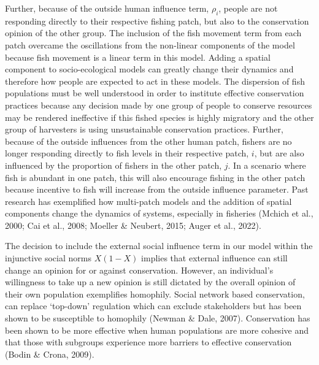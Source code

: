 \documentclass[
  12pt,
]{article}
\begin{document}
Further, because of the outside human influence term, \(\rho_i\), people are not responding directly to their respective fishing patch, but also to the conservation opinion of the other group. The inclusion of the fish movement term from each patch overcame the oscillations from the non-linear components of the model because fish movement is a linear term in this model. Adding a spatial component to socio-ecological models can greatly change their dynamics and therefore how people are expected to act in these models. The dispersion of fish populations must be well understood in order to institute effective conservation practices because any decision made by one group of people to conserve resources may be rendered ineffective if this fished species is highly migratory and the other group of harvesters is using unsustainable conservation practices. Further, because of the outside influences from the other human patch, fishers are no longer responding directly to fish levels in their respective patch, \(i\), but are also influenced by the proportion of fishers in the other patch, \(j\). In a scenario where fish is abundant in one patch, this will also encourage fishing in the other patch because incentive to fish will increase from the outside influence parameter. Past research has exemplified how multi-patch models and the addition of spatial components change the dynamics of systems, especially in fisheries (Mchich et al., 2000; Cai et al., 2008; Moeller \& Neubert, 2015; Auger et al., 2022).

The decision to include the external social influence term in our model within the injunctive social norms \(X(1-X)\) implies that external influence can still change an opinion for or against conservation. However, an individual's willingness to take up a new opinion is still dictated by the overall opinion of their own population exemplifies homophily. Social network based conservation, can replace `top-down' regulation which can exclude stakeholders but has been shown to be susceptible to homophily (Newman \& Dale, 2007). Conservation has been shown to be more effective when human populations are more cohesive and that those with subgroups experience more barriers to effective conservation (Bodin \& Crona, 2009).
\end{document}
